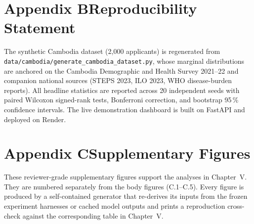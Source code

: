\bigskip
\section*{Appendix B\quad Reproducibility Statement}

The synthetic Cambodia dataset (2{,}000 applicants) is regenerated from
\texttt{data/cambodia/generate\_cambodia\_dataset.py}, whose marginal distributions
are anchored on the Cambodia Demographic and Health Survey 2021--22 and companion
national sources (STEPS 2023, ILO 2023, WHO disease-burden reports). All headline
statistics are reported across 20 independent seeds with paired Wilcoxon
signed-rank tests, Bonferroni correction, and bootstrap 95\,\% confidence intervals.
The live demonstration dashboard is built on FastAPI and deployed on Render.

\bigskip
\section*{Appendix C\quad Supplementary Figures}

These reviewer-grade supplementary figures support the analyses in Chapter~V. They
are numbered separately from the body figures (C.1--C.5). Every figure is produced
by a self-contained generator that re-derives its inputs from the frozen experiment
harnesses or cached model outputs and prints a reproduction cross-check against the
corresponding table in Chapter~V.


